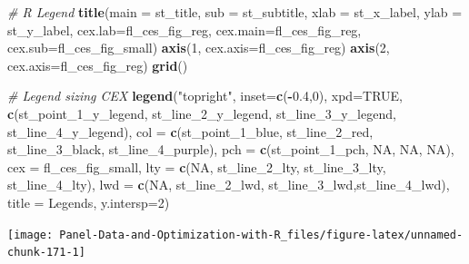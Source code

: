 \documentclass[
]{book}
\newenvironment{Shaded}{\begin{snugshade}}{\end{snugshade}}
\newcommand{\CommentTok}[1]{\textcolor[rgb]{0.56,0.35,0.01}{\textit{#1}}}
\newcommand{\DataTypeTok}[1]{\textcolor[rgb]{0.13,0.29,0.53}{#1}}
\newcommand{\DecValTok}[1]{\textcolor[rgb]{0.00,0.00,0.81}{#1}}
\newcommand{\FloatTok}[1]{\textcolor[rgb]{0.00,0.00,0.81}{#1}}
\newcommand{\KeywordTok}[1]{\textcolor[rgb]{0.13,0.29,0.53}{\textbf{#1}}}
\newcommand{\NormalTok}[1]{#1}
\newcommand{\OperatorTok}[1]{\textcolor[rgb]{0.81,0.36,0.00}{\textbf{#1}}}
\newcommand{\OtherTok}[1]{\textcolor[rgb]{0.56,0.35,0.01}{#1}}
\newcommand{\StringTok}[1]{\textcolor[rgb]{0.31,0.60,0.02}{#1}}
\begin{document}
\begin{Shaded}
\begin{Highlighting}[]
\CommentTok{\# R Legend}
\KeywordTok{title}\NormalTok{(}\DataTypeTok{main =}\NormalTok{ st\_title, }\DataTypeTok{sub =}\NormalTok{ st\_subtitle, }\DataTypeTok{xlab =}\NormalTok{ st\_x\_label, }\DataTypeTok{ylab =}\NormalTok{ st\_y\_label,}
      \DataTypeTok{cex.lab=}\NormalTok{fl\_ces\_fig\_reg,}
      \DataTypeTok{cex.main=}\NormalTok{fl\_ces\_fig\_reg,}
      \DataTypeTok{cex.sub=}\NormalTok{fl\_ces\_fig\_small)}
\KeywordTok{axis}\NormalTok{(}\DecValTok{1}\NormalTok{, }\DataTypeTok{cex.axis=}\NormalTok{fl\_ces\_fig\_reg)}
\KeywordTok{axis}\NormalTok{(}\DecValTok{2}\NormalTok{, }\DataTypeTok{cex.axis=}\NormalTok{fl\_ces\_fig\_reg)}
\KeywordTok{grid}\NormalTok{()}

\CommentTok{\# Legend sizing CEX}
\KeywordTok{legend}\NormalTok{(}\StringTok{"topright"}\NormalTok{,}
       \DataTypeTok{inset=}\KeywordTok{c}\NormalTok{(}\OperatorTok{{-}}\FloatTok{0.4}\NormalTok{,}\DecValTok{0}\NormalTok{),}
       \DataTypeTok{xpd=}\OtherTok{TRUE}\NormalTok{,}
       \KeywordTok{c}\NormalTok{(st\_point\_}\DecValTok{1}\NormalTok{\_y\_legend, st\_line\_}\DecValTok{2}\NormalTok{\_y\_legend, st\_line\_}\DecValTok{3}\NormalTok{\_y\_legend, st\_line\_}\DecValTok{4}\NormalTok{\_y\_legend),}
       \DataTypeTok{col =} \KeywordTok{c}\NormalTok{(st\_point\_}\DecValTok{1}\NormalTok{\_blue, st\_line\_}\DecValTok{2}\NormalTok{\_red, st\_line\_}\DecValTok{3}\NormalTok{\_black, st\_line\_}\DecValTok{4}\NormalTok{\_purple),}
       \DataTypeTok{pch =} \KeywordTok{c}\NormalTok{(st\_point\_}\DecValTok{1}\NormalTok{\_pch, }\OtherTok{NA}\NormalTok{, }\OtherTok{NA}\NormalTok{, }\OtherTok{NA}\NormalTok{),}
       \DataTypeTok{cex =}\NormalTok{ fl\_ces\_fig\_small,}
       \DataTypeTok{lty =} \KeywordTok{c}\NormalTok{(}\OtherTok{NA}\NormalTok{, st\_line\_}\DecValTok{2}\NormalTok{\_lty, st\_line\_}\DecValTok{3}\NormalTok{\_lty, st\_line\_}\DecValTok{4}\NormalTok{\_lty),}
       \DataTypeTok{lwd =} \KeywordTok{c}\NormalTok{(}\OtherTok{NA}\NormalTok{, st\_line\_}\DecValTok{2}\NormalTok{\_lwd, st\_line\_}\DecValTok{3}\NormalTok{\_lwd,st\_line\_}\DecValTok{4}\NormalTok{\_lwd),}
       \DataTypeTok{title =} \StringTok{\textquotesingle{}Legends\textquotesingle{}}\NormalTok{,}
       \DataTypeTok{y.intersp=}\DecValTok{2}\NormalTok{)}
\end{Highlighting}
\end{Shaded}

\begin{center}\texttt{[image: Panel-Data-and-Optimization-with-R\_files/figure-latex/unnamed-chunk-171-1]} \end{center}
\end{document}
